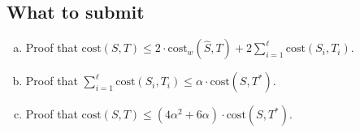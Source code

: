 \subsection*{What to submit}
\begin{enumerate}[(a)]
	\item Proof that $\mathrm{cost}(S,T) \leq 2\cdot
	\mathrm{cost}_w(\widehat{S}, T) + 2\sum_{i=1}^{\ell} \mathrm{cost}(S_i, T_i)$.
	\item Proof that $\sum_{i=1}^{\ell} \mathrm{cost}(S_i, T_i) \leq
\alpha \cdot \mathrm{cost}(S,T^{*})$.
	\item Proof that $\mathrm{cost}(S,T) \leq (4\alpha^2+6\alpha)
\cdot \mathrm{cost}(S,T^{*})$.
\end{enumerate}

